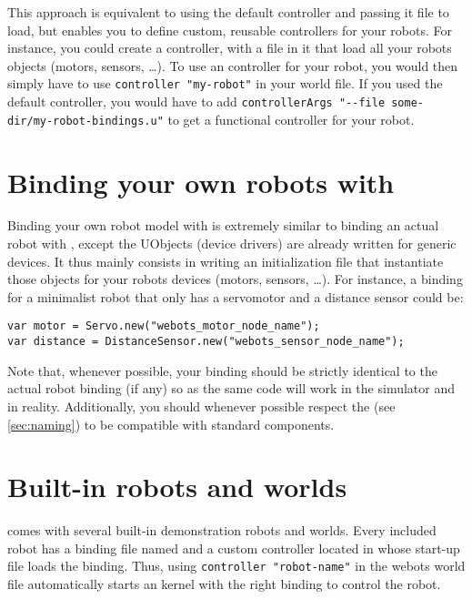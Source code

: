 This approach is equivalent to using the default 
controller and passing it file to load, but enables you to define
custom, reusable controllers for your robots. For instance, you could
create a  controller, with a
 file in it that load all your robots objects (motors,
sensors, \ldots). To use an \urbi controller for your robot, you would
then simply have to use \lstinline+controller "my-robot"+ in your
world file. If you used the default  controller, you
would have to add \lstinline+controllerArgs "--file some-dir/my-robot-bindings.u"+
to get a functional controller for your robot.

\section{Binding your own robots with \uwebots}

Binding your own robot model with \uwebots is extremely similar to
binding an actual robot with \urbi, except the UObjects (device
drivers) are already written for \webots generic devices. It thus
mainly consists in writing an initialization \us file that instantiate
those \urbi objects for your robots devices (motors, sensors,
\ldots). For instance, a binding for a minimalist robot that only has
a servomotor and a distance sensor could be:

\begin{lstlisting}
var motor = Servo.new("webots_motor_node_name");
var distance = DistanceSensor.new("webots_sensor_node_name");
\end{lstlisting}

Note that, whenever possible, your \webots binding should be strictly
identical to the actual robot binding (if any) so as the same \urbi
code will work in the simulator and in reality. Additionally, you
should whenever possible respect the \gsrapi (see
\autoref{sec:naming}) to be compatible with standard \urbi components.

\section{Built-in robots and worlds}

\uwebots comes with several built-in demonstration robots and
worlds. Every included robot has a binding file named
 and a
custom controller located in
 whose 
start-up file loads the binding. Thus, using \lstinline+controller "robot-name"+
in the webots world file automatically starts an \urbi
kernel with the right binding to control the robot.

